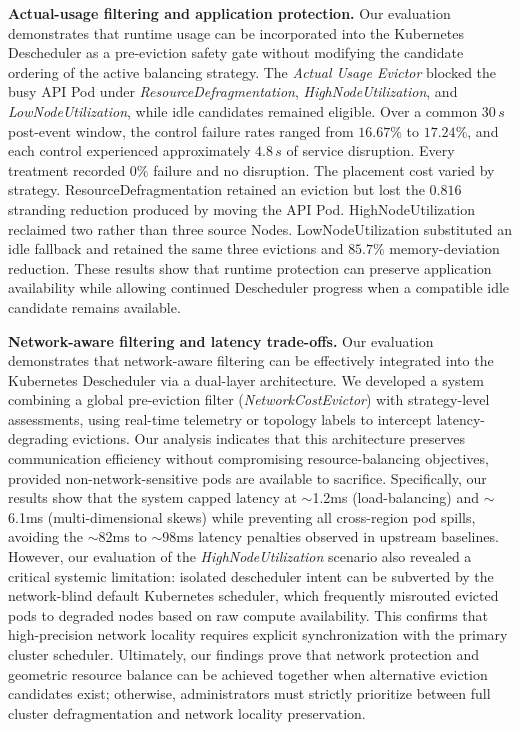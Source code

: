 \textbf{Actual-usage filtering and application protection.} Our evaluation demonstrates that runtime usage can be incorporated into the Kubernetes Descheduler as a pre-eviction safety gate without modifying the candidate ordering of the active balancing strategy. The \textit{Actual Usage Evictor} blocked the busy API Pod under \textit{ResourceDefragmentation}, \textit{HighNodeUtilization}, and \textit{LowNodeUtilization}, while idle candidates remained eligible. Over a common \(30\,s\) post-event window, the control failure rates ranged from \(16.67\%\) to \(17.24\%\), and each control experienced approximately \(4.8\,s\) of service disruption. Every treatment recorded \(0\%\) failure and no disruption. The placement cost varied by strategy. ResourceDefragmentation retained an eviction but lost the \(0.816\) stranding reduction produced by moving the API Pod. HighNodeUtilization reclaimed two rather than three source Nodes. LowNodeUtilization substituted an idle fallback and retained the same three evictions and \(85.7\%\) memory-deviation reduction. These results show that runtime protection can preserve application availability while allowing continued Descheduler progress when a compatible idle candidate remains available.

\textbf{Network-aware filtering and latency trade-offs.} Our evaluation demonstrates that network-aware filtering can be effectively integrated into the Kubernetes Descheduler via a dual-layer architecture. We developed a system combining a global pre-eviction filter (\textit{NetworkCostEvictor}) with strategy-level assessments, using real-time telemetry or topology labels to intercept latency-degrading evictions. Our analysis indicates that this architecture preserves communication efficiency without compromising resource-balancing objectives, provided non-network-sensitive pods are available to sacrifice. Specifically, our results show that the system capped latency at $\sim$1.2ms (load-balancing) and $\sim$6.1ms (multi-dimensional skews) while preventing all cross-region pod spills, avoiding the $\sim$82ms to $\sim$98ms latency penalties observed in upstream baselines. However, our evaluation of the \textit{HighNodeUtilization} scenario also revealed a critical systemic limitation: isolated descheduler intent can be subverted by the network-blind default Kubernetes scheduler, which frequently misrouted evicted pods to degraded nodes based on raw compute availability. This confirms that high-precision network locality requires explicit synchronization with the primary cluster scheduler. Ultimately, our findings prove that network protection and geometric resource balance can be achieved together when alternative eviction candidates exist; otherwise, administrators must strictly prioritize between full cluster defragmentation and network locality preservation. 

